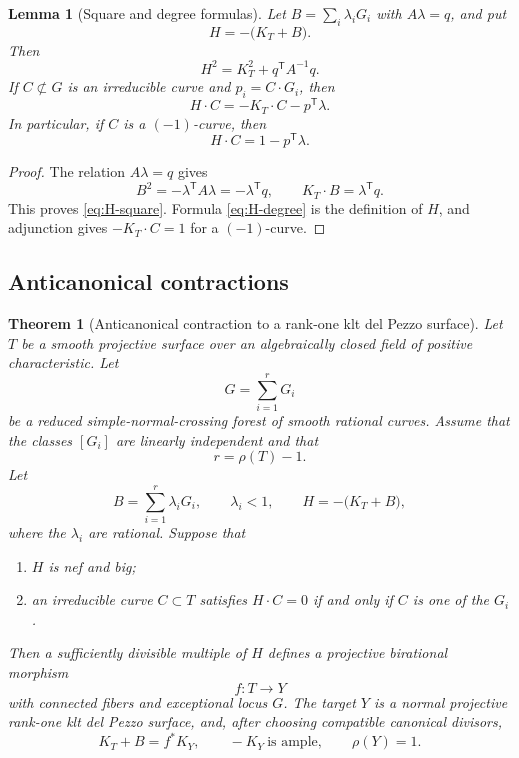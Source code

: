 \documentclass[11pt,reqno]{amsart}
\newtheorem{theorem}{Theorem}[section]
\newtheorem{lemma}[lemma]{Lemma}
\theoremstyle{definition}
\theoremstyle{remark}
\numberwithin{equation}{section}
\begin{document}
\begin{lemma}[Square and degree formulas]\label{lem:square-degree}
Let $B=\sum_i\lambda_iG_i$ with $A\lambda=q$, and put
\[
  H=-\bigl(K_T+B\bigr).
\]
Then
\begin{equation}\label{eq:H-square}
  H^2=K_T^2+q^{\mathsf T}A^{-1}q.
\end{equation}
If $C\not\subset G$ is an irreducible curve and $p_i=C\cdot G_i$, then
\begin{equation}\label{eq:H-degree}
  H\cdot C=-K_T\cdot C-p^{\mathsf T}\lambda.
\end{equation}
In particular, if $C$ is a $(-1)$-curve, then
\begin{equation}\label{eq:minus-one-degree}
  H\cdot C=1-p^{\mathsf T}\lambda.
\end{equation}
\end{lemma}

\begin{proof}
The relation $A\lambda=q$ gives
\[
  B^2=-\lambda^{\mathsf T}A\lambda=-\lambda^{\mathsf T}q,
  \qquad K_T\cdot B=\lambda^{\mathsf T}q.
\]
This proves \eqref{eq:H-square}.  Formula \eqref{eq:H-degree} is the definition of $H$, and adjunction gives $-K_T\cdot C=1$ for a $(-1)$-curve.
\end{proof}

\subsection{Anticanonical contractions}

\begin{theorem}[Anticanonical contraction to a rank-one klt del Pezzo surface]\label{thm:anticanonical-contraction}
Let $T$ be a smooth projective surface over an algebraically closed field of positive characteristic.  Let
\[
  G=\sum_{i=1}^rG_i
\]
be a reduced simple-normal-crossing forest of smooth rational curves.  Assume that the classes $[G_i]$ are linearly independent and that
\[
  r=\rho(T)-1.
\]
Let
\[
  B=\sum_{i=1}^r\lambda_iG_i,
  \qquad \lambda_i<1,
  \qquad H=-\bigl(K_T+B\bigr),
\]
where the $\lambda_i$ are rational.  Suppose that
\begin{enumerate}[label=\textup{(\roman*)}]
\item $H$ is nef and big;
\item an irreducible curve $C\subset T$ satisfies $H\cdot C=0$ if and only if $C$ is one of the $G_i$.
\end{enumerate}
Then a sufficiently divisible multiple of $H$ defines a projective birational morphism
\[
  f:T\longrightarrow Y
\]
with connected fibers and exceptional locus $G$.  The target $Y$ is a normal projective rank-one klt del Pezzo surface, and, after choosing compatible canonical divisors,
\begin{equation}\label{eq:crepant-contraction}
  K_T+B=f^*K_Y,
  \qquad -K_Y\ \text{is ample},
  \qquad \rho(Y)=1.
\end{equation}
\end{theorem}
\end{document}
